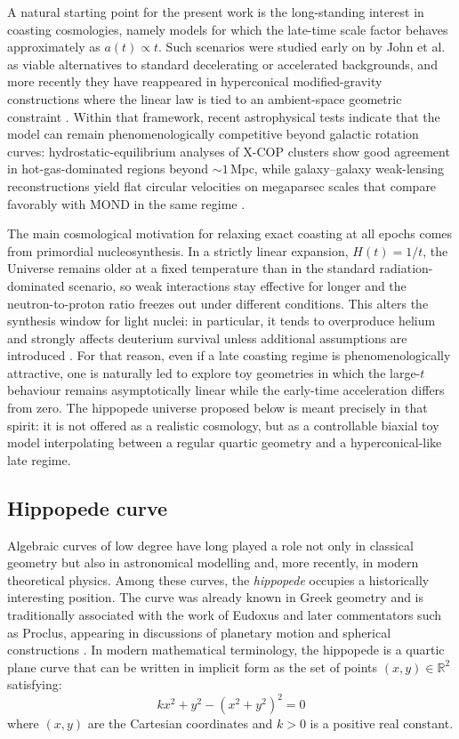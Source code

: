 \documentclass[11pt]{article}
\begin{document}
A natural starting point for the present work is the long-standing interest in coasting cosmologies, namely models for which the late-time scale factor behaves approximately as $a(t)\propto t$. Such scenarios were studied early on by John et al. \cite{john2000coasting, John2019} as viable alternatives to standard decelerating or accelerated backgrounds, and more recently they have reappeared in hyperconical modified-gravity constructions where the linear law is tied to an ambient-space geometric constraint \cite{monjo2017hyperconical, Monjo_2024, Monjo_2025}. Within that framework, recent astrophysical tests indicate that the model can remain phenomenologically competitive beyond galactic rotation curves: hydrostatic-equilibrium analyses of X-COP clusters show good agreement in hot-gas-dominated regions beyond $\sim1\,\mathrm{Mpc}$, while galaxy--galaxy weak-lensing reconstructions yield flat circular velocities on megaparsec scales that compare favorably with MOND in the same regime \cite{monjo2025clusters, monjo2025lensing}.

The main cosmological motivation for relaxing exact coasting at all epochs comes from primordial nucleosynthesis. In a strictly linear expansion, $H(t)=1/t$, the Universe remains older at a fixed temperature than in the standard radiation-dominated scenario, so weak interactions stay effective for longer and the neutron-to-proton ratio freezes out under different conditions. This alters the synthesis window for light nuclei: in particular, it tends to overproduce helium and strongly affects deuterium survival unless additional assumptions are introduced \cite{sethi1999coasting, dev2002coasting}. For that reason, even if a late coasting regime is phenomenologically attractive, one is naturally led to explore toy geometries in which the large-$t$ behaviour remains asymptotically linear while the early-time acceleration differs from zero. The hippopede universe proposed below is meant precisely in that spirit: it is not offered as a realistic cosmology, but as a controllable biaxial toy model interpolating between a regular quartic geometry and a hyperconical-like late regime.

\subsection{Hippopede curve}
Algebraic curves of low degree have long played a role not only in classical geometry but also in astronomical modelling and, more recently, in modern theoretical physics. Among these curves, the \emph{hippopede} occupies a historically interesting position. The curve was already known in Greek geometry and is traditionally associated with the work of Eudoxus and later commentators such as Proclus, appearing in discussions of planetary motion and spherical constructions \cite{Gregory_2011, Taub2020, BotteriCasazza2023}. In modern mathematical terminology, the hippopede is a quartic plane curve that can be written in implicit form as the set of points $(x,y) \in \mathbb{R}^2$ satisfying:
\begin{equation}
    k x^2 + y^2 - (x^2+y^2)^2 = 0
\end{equation}
where $(x,y)$ are the Cartesian coordinates and $k > 0$ is a positive real constant.
\end{document}
